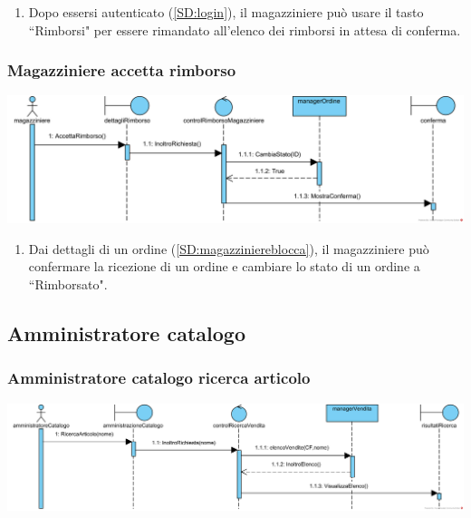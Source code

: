 \documentclass[12pt]{article}
\begin{document}
\begin{enumerate}
\item Dopo essersi autenticato (\ref{SD:login}), il magazziniere può usare il tasto ``Rimborsi" per essere rimandato all'elenco dei rimborsi in attesa di conferma.
\end{enumerate}

\subsubsection{Magazziniere accetta rimborso}
\label{SD:magazzrimborsook}
\begin{center}
\includegraphics[width=\textwidth]{SequenceDiagram/magazziniereRimborsoAccetta}
\end{center}

\begin{enumerate}
\item Dai dettagli di un ordine (\ref{SD:magazziniereblocca}), il magazziniere può confermare la ricezione di un ordine e cambiare lo stato di un ordine a ``Rimborsato".
\end{enumerate}

\newpage

\subsection{Amministratore catalogo}
\subsubsection{Amministratore catalogo ricerca articolo}
\label{SD:amcatvisualizzaelenco}
\begin{center}
\includegraphics[width=\textwidth]{SequenceDiagram/AmministratoreCatalogoVenditaRicerca}
\end{center}
\end{document}
